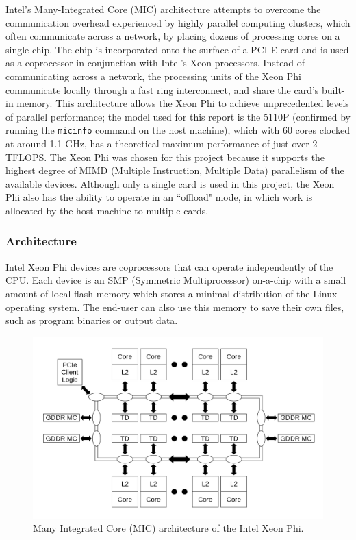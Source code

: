 \documentclass{report}
\begin{document}
Intel's Many-Integrated Core (MIC) architecture attempts to overcome the communication overhead experienced by highly parallel computing clusters, which often communicate across a network, by placing dozens of processing cores on a single chip\cite{Jeffers13}. The chip is incorporated onto the surface of a PCI-E card and is used as a coprocessor in conjunction with Intel's Xeon processors. Instead of communicating across a network, the processing units of the Xeon Phi communicate locally through a fast ring interconnect, and share the card's built-in memory. This architecture allows the Xeon Phi to achieve unprecedented levels of parallel performance; the model used for this report is the 5110P (confirmed by running the \verb!micinfo! command on the host machine), which with 60 cores clocked at around 1.1 GHz, has a theoretical maximum performance of just over 2 TFLOPS\cite{Jeffers13}. The Xeon Phi was chosen for this project because it supports the highest degree of MIMD (Multiple Instruction, Multiple Data) parallelism of the available devices. Although only a single card is used in this project, the Xeon Phi also has the ability to operate in an ``offload" mode, in which work is allocated by the host machine to multiple cards\cite{Jeffers13}.

\subsubsection{Architecture} \label{Sec:phiarchitecture}

Intel Xeon Phi devices are coprocessors that can operate independently of the CPU. Each device is an SMP (Symmetric Multiprocessor) on-a-chip with a small amount of local flash memory which stores a minimal distribution of the Linux operating system\cite{Jeffers13}. The end-user can also use this memory to save their own files, such as program binaries or output data.
\noindent
\begin{figure}
	\includegraphics[width=\linewidth]{../diagrams/xeon_phi}
	\caption{Many Integrated Core (MIC) architecture of the Intel Xeon Phi\cite{overviewxeonandxeonphi}.}
	\label{Fig:xeonphi}
\end{figure}
\end{document}
